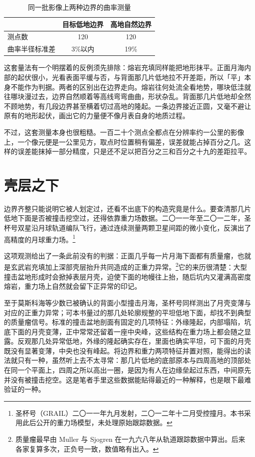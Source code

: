 \begin{table}[htbp]
  \centering
  \caption{同一批影像上两种边界的曲率测量}
  \begin{tabular}{@{}lcc@{}}
    \toprule
    & 目标低地边界 & 高地自然边界\\
    \midrule
    测点数 & 120 & 120 \\
    曲率半径标准差 & 3\%以内 & 19\% \\
    \bottomrule
  \end{tabular}
\end{table}

这套量法有一个明摆着的反例须先排除：熔岩充填同样能把地形抹平。正面月海内部的起伏很小，光看表面平缓与否，与背面那几片低地拉不开差距，所以「平」本身不能作为判据。两者的区别出在边界走向。熔岩往何处流全看地势，哪块低洼就往哪块漫过去，边界自然顺着等高线弯弯曲曲，形状杂乱。背面那几片低地却全然不顾地势，有几段边界甚至横着切过高地的隆起。一条边界接近正圆，又毫不避让原有的地形起伏，画出它的力量便不像月表自身的地质过程。

不过，这套测量本身也很粗糙。一百二十个测点全都点在分辨率约一公里的影像上，一个像元便是一公里见方，取点时位置稍有偏差，误差就能占掉百分之几。这样的误差能抹掉一部分精度，只是还不足以把百分之三和百分之十九的差距拉平。

\section{壳层之下}

边界齐整只能说明它被人划定过，还看不出底下的构造究竟是什么。要查清那几片低地下面是否被撞击挖空过，还得依靠重力场数据。二〇一一年至二〇一二年，圣杯号双星沿月球轨道编队飞行，通过连续测量两颗卫星间距的微小变化，反演出了高精度的月球重力场。\footnote{圣杯号（GRAIL）二〇一一年九月发射，二〇一二年十二月受控撞月。本书采用此后公开的重力场模型，未处理原始跟踪数据。}

这项观测给出了一条此前没有的判据：正面几乎每一片月海下面都有质量瘤，也就是玄武岩充填加上深部壳层抬升共同造成的正重力异常。\footnote{质量瘤最早由 Muller 与 Sjogren 在一九六八年从轨道跟踪数据中算出。后来各家复算多次，正负号一致，数值略有出入。}它的来历很清楚：大型撞击盆地形成时会掀掉表层月壳，迫使下面的地幔往上抬，随后坑内又灌满高密度熔岩，重力场上自然就会留下正异常的印记。

至于莫斯科海等少数已被确认的背面小型撞击月海，圣杯号同样测出了月壳变薄与对应的正重力异常；可本书量过的那几处轮廓规整的平坦低地下面，却找不到典型的质量瘤信号。标准的撞击盆地剖面有固定的几项特征：外缘隆起，内部塌陷，坑底下面的月壳变薄，正中常常还留着一座中央峰，这些结构在重力场上都会随之显露。反观那几处异常低地，外缘的隆起确实存在，里面也确实平坦，可下面的月壳既没有显著变薄，中央也没有峰起。将边界和重力两项特征并置对照，能得出的读法就只有一种，虽然听上去不太寻常：那几片低地的底部原本与四周高地的顶部处在同一个平面上，四周之所以高出一圈，是因为有人在边缘垒起过东西，中间原先并没有被撞击挖空。这是笔者手里这些数据能贴得最近的一种解释，也是眼下最难验证的一种。

